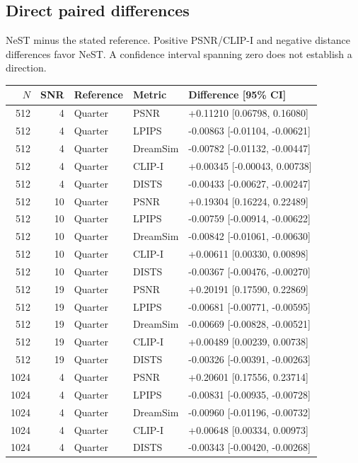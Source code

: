 \documentclass[10pt,letterpaper]{article}
\begin{document}
\subsection{Direct paired differences}
NeST minus the stated reference. Positive PSNR/CLIP-I and negative distance differences favor NeST. A confidence interval spanning zero does not establish a direction.

\begin{longtable}{@{}rrlll@{}}\toprule
$N$ & SNR & Reference & Metric & Difference [95\% CI]\\\midrule\endhead
512 & 4 & Quarter & PSNR & +0.11210 [0.06798, 0.16080]\\
512 & 4 & Quarter & LPIPS & -0.00863 [-0.01104, -0.00621]\\
512 & 4 & Quarter & DreamSim & -0.00782 [-0.01132, -0.00447]\\
512 & 4 & Quarter & CLIP-I & +0.00345 [-0.00043, 0.00738]\\
512 & 4 & Quarter & DISTS & -0.00433 [-0.00627, -0.00247]\\
512 & 10 & Quarter & PSNR & +0.19304 [0.16224, 0.22489]\\
512 & 10 & Quarter & LPIPS & -0.00759 [-0.00914, -0.00622]\\
512 & 10 & Quarter & DreamSim & -0.00842 [-0.01061, -0.00630]\\
512 & 10 & Quarter & CLIP-I & +0.00611 [0.00330, 0.00898]\\
512 & 10 & Quarter & DISTS & -0.00367 [-0.00476, -0.00270]\\
512 & 19 & Quarter & PSNR & +0.20191 [0.17590, 0.22869]\\
512 & 19 & Quarter & LPIPS & -0.00681 [-0.00771, -0.00595]\\
512 & 19 & Quarter & DreamSim & -0.00669 [-0.00828, -0.00521]\\
512 & 19 & Quarter & CLIP-I & +0.00489 [0.00239, 0.00738]\\
512 & 19 & Quarter & DISTS & -0.00326 [-0.00391, -0.00263]\\
1024 & 4 & Quarter & PSNR & +0.20601 [0.17556, 0.23714]\\
1024 & 4 & Quarter & LPIPS & -0.00831 [-0.00935, -0.00728]\\
1024 & 4 & Quarter & DreamSim & -0.00960 [-0.01196, -0.00732]\\
1024 & 4 & Quarter & CLIP-I & +0.00648 [0.00334, 0.00973]\\
1024 & 4 & Quarter & DISTS & -0.00343 [-0.00420, -0.00268]\\

\end{longtable}
\end{document}
